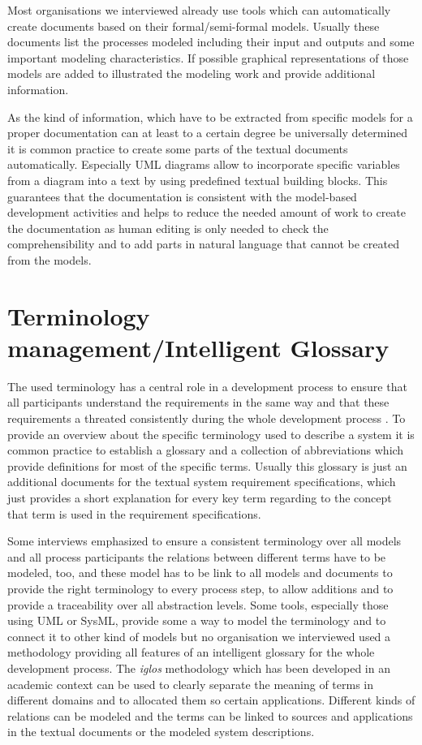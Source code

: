 \documentclass{./template/openetcs_report}
\begin{document}
Most organisations we interviewed already use tools which can automatically create documents based on their formal/semi-formal models. Usually these documents list the processes modeled including their input and outputs and some important modeling characteristics. If possible graphical representations of those models are added to illustrated the modeling work and provide additional information.

As the kind of information, which have to be extracted from specific models for a proper documentation can at least to a certain degree be universally determined it is common practice to 
create some parts of the textual documents automatically. Especially UML diagrams allow to incorporate specific variables from a diagram into a text by using predefined textual building blocks. This guarantees that the documentation is consistent with the model-based development activities and helps to reduce the needed amount of work to create the documentation as human editing is only needed to check the comprehensibility and to add parts in natural language that cannot be created from the models.

\section{Terminology management/Intelligent Glossary}

The used terminology has a central role in a development process to ensure that all participants understand the requirements in the same way and that these requirements a threated consistently during the whole development process \citep{Schnieder.2010}. To provide an overview about the specific terminology used to describe a system it is common practice to establish a glossary and a collection of abbreviations which provide definitions for most of the specific terms. Usually this glossary is just an additional documents for the textual system requirement specifications, which just provides a short explanation for every key term regarding to the concept that term is used in the requirement specifications. 

Some interviews emphasized to ensure a consistent terminology over all models and all process participants the relations between different terms have to be modeled, too, and these model has to be link to all models and documents to provide the right terminology to every process step, to allow additions and to provide a traceability over all abstraction levels. Some tools, especially those using UML or SysML, provide some a way to model the terminology and to connect it to other kind of models but no organisation we interviewed used a methodology providing all features of an intelligent glossary for the whole development process. The \textit{iglos} methodology which has been developed in an academic context can be used to clearly separate the meaning of terms in different domains and to allocated them so certain applications. Different kinds of relations can be modeled and the terms can be linked to sources and applications in the textual documents or the modeled system descriptions.
\end{document}
